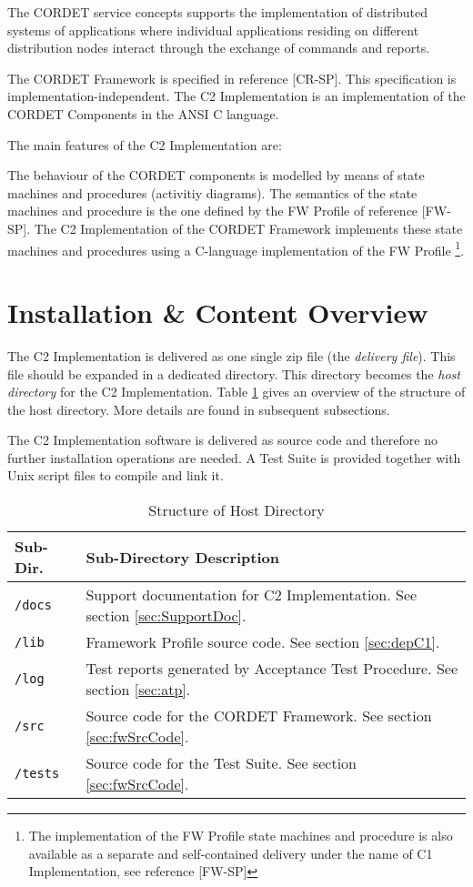 \documentclass{pnp_article}
\begin{document}
The CORDET service concepts supports the implementation of distributed systems of applications where individual applications residing on different distribution nodes interact through the exchange of commands and reports.

The CORDET Framework is specified in reference [CR-SP]. This specification is implementation-independent. The C2 Implementation is an implementation of the CORDET Components in the ANSI C language.

The main features of the C2 Implementation are:


The behaviour of the CORDET components is modelled by means of state machines and procedures (activitiy diagrams). The semantics of the state machines and procedure is the one defined by the FW Profile of reference [FW-SP]. The C2 Implementation of the CORDET Framework implements these state machines and procedures using a C-language implementation of the FW Profile \footnote{The implementation of the FW Profile state machines and procedure is also available as a separate and self-contained delivery under the name of C1 Implementation, see reference [FW-SP]}. 

\section{Installation \& Content Overview}\label{sec:InstAndContentOverview}
The C2 Implementation is delivered as one single zip file (the \emph{delivery file}).
This file should be expanded in a dedicated directory. 
This directory becomes the \emph{host directory} for the C2 Implementation.
Table \ref{tab:HostDir} gives an overview of the structure of the host directory.
More details are found in subsequent subsections.

The C2 Implementation software is delivered as source code and therefore no further installation operations are needed. A Test Suite is provided together with Unix script files to compile and link it.

\begin{longtable}{|l|p{11cm}|}
\caption{Structure of Host Directory}\label{tab:HostDir} \\
\hline
\rowcolor{light-gray}
\textbf{Sub-Dir.} & \textbf{Sub-Directory Description}\\
\hline\hline
\texttt{/docs} & Support documentation for C2 Implementation. See section \ref{sec:SupportDoc}.\\
\hline
\texttt{/lib} & Framework Profile source code. See section \ref{sec:depC1}.\\
\hline
\texttt{/log} & Test reports generated by Acceptance Test Procedure. See section \ref{sec:atp}.\\
\hline
\texttt{/src} & Source code for the CORDET Framework. See section \ref{sec:fwSrcCode}.\\
\hline
\texttt{/tests} & Source code for the Test Suite. See section \ref{sec:fwSrcCode}.\\
\hline
\end{longtable}
\end{document}
